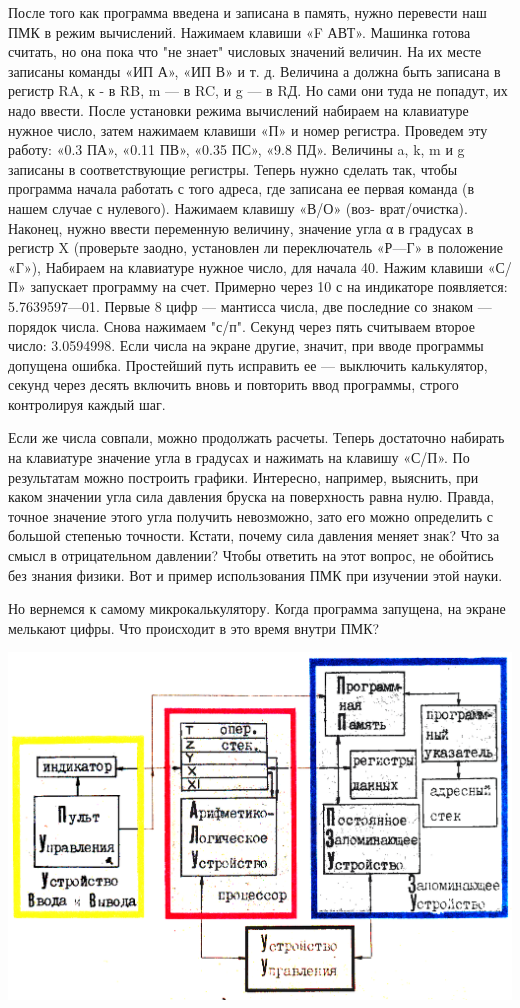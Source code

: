 \documentclass[11pt,a4paper,oneside]{article}
\begin{document}
После того как программа введена и записана в память, нужно перевести наш ПМК в режим вычислений. Нажимаем клавиши «F АВТ». Машинка готова считать, но она пока что "не знает" числовых значений величин. На их месте записаны команды «ИП А», «ИП В» и т. д. Величина а должна быть записана в регистр RA, к - в RB, m — в RC, и g — в RД. Но сами они туда не попадут, их надо ввести. После установки режима вычислений набираем на клавиатуре нужное число, затем нажимаем клавиши «П» и номер регистра. Проведем эту работу: «0.3 ПА», «0.11 ПВ», «0.35 ПС», «9.8 ПД». Величины a, k, m и g записаны в соответствующие регистры. Теперь нужно сделать так, чтобы программа начала работать с того адреса, где записана ее первая команда (в нашем случае с нулевого). Нажимаем клавишу «В/О» (воз- врат/очистка). Наконец, нужно ввести переменную величину, значение угла α в градусах в регистр X (проверьте заодно, установлен ли переключатель «Р—Г» в положение «Г»), Набираем на клавиатуре нужное число, для начала 40. Нажим клавиши «С/П» запускает программу на счет. Примерно через 10 с на индикаторе появляется: 5.7639597—01. Первые 8 цифр — мантисса числа, две последние со знаком — порядок
числа. Снова нажимаем "с/п". Секунд через пять считываем второе число: 3.0594998. Если числа на экране другие, значит, при вводе программы допущена ошибка. Простейший путь исправить ее — выключить калькулятор, секунд через десять включить вновь и повторить ввод программы, строго контролируя каждый шаг.

Если же числа совпали, можно продолжать расчеты. Теперь достаточно набирать на клавиатуре значение угла в градусах и нажимать на клавишу «С/П». По результатам можно построить графики. Интересно, например, выяснить, при каком значении угла сила давления бруска на поверхность равна нулю. Правда, точное значение этого угла получить невозможно, зато его можно определить с большой степенью точности. Кстати, почему сила давления меняет знак? Что за смысл в отрицательном давлении? Чтобы ответить на этот вопрос, не обойтись без знания физики. Вот и пример использования ПМК при изучении этой науки.

Но вернемся к самому микрокалькулятору. Когда программа запущена, на экране мелькают цифры. Что происходит в это время внутри ПМК?

\includegraphics[width=\textwidth]{princip_scheme}
\end{document}
